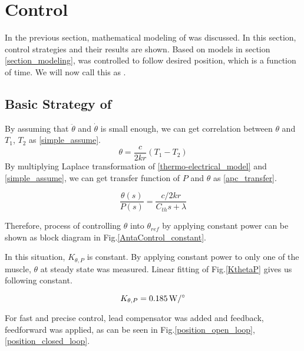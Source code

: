 \section{Control}
In the previous section, mathematical modeling of \scp was discussed. In this section, control strategies and their results are shown. Based on models in section \ref{section_modeling}, \anta was controlled to follow desired position, which is a function of time. We will now call this as \Apcnospace.

\subsection{Basic Strategy of \APC}
By assuming that $\ddot{\theta}$ and $\dot{\theta}$ is small enough, we can get correlation between $\theta$ and $T_{1}$, $T_{2}$ as \eqref{simple_assume}.
\begin{equation} \label{simple_assume}
\theta = \frac{c}{2kr}(T_{1}-T_{2})
\end{equation}
By multiplying Laplace transformation of \eqref{thermo-electrical_model} and \eqref{simple_assume}, we can get transfer function of $P$ and $\theta$ as \eqref{apc_transfer}.

\begin{equation} \label{apc_transfer}
\frac{\theta(s)}{P(s)} = \frac{c/2kr}{C_{th}s+\lambda}
\end{equation}

Therefore, process of controlling $\theta$ into $\theta_{ref}$ by applying constant power can be shown as block diagram in Fig.\ref{AntaControl_constant}. 

In this situation, $K_{\theta,P}$ is constant. By applying constant power to only one of the muscle, $\theta$ at steady state was measured. Linear fitting of Fig.\ref{KthetaP} gives us following constant.

\begin{equation}
K_{\theta,P} = \SI{0.185}{\watt\per\degree} \notag
\end{equation}

For fast and precise control, lead compensator was added and feedback, feedforward was applied, as can be seen in Fig.\ref{position_open_loop}, \ref{position_closed_loop}.

